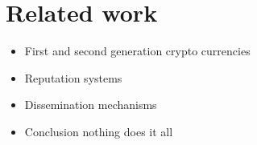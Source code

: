 \section{Related work}
{\color{red}
\begin{itemize}
    \item First and second generation crypto currencies
    \item Reputation systems
    \item Dissemination mechanisms
    \item Conclusion nothing does it all
\end{itemize}}




